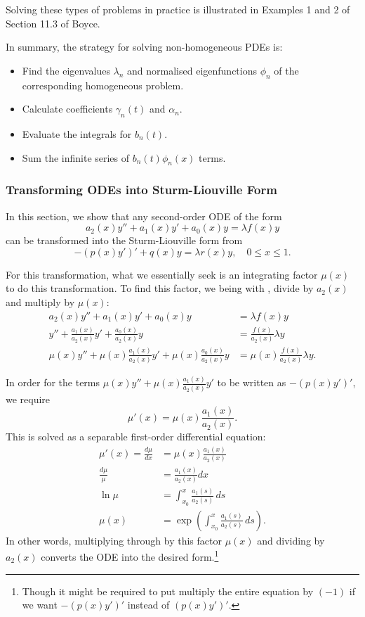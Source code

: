 Solving these types of problems in practice is illustrated in Examples 1 and 2 of Section 11.3 of Boyce.

In summary, the strategy for solving non-homogeneous PDEs is:
\begin{itemize}
	\item Find the eigenvalues $\lambda_n$ and normalised eigenfunctions $\phi_n$ of the corresponding homogeneous problem.
	\item Calculate coefficients $\gamma_n(t)$ and $\alpha_n$.
	\item Evaluate the integrals for $b_n(t)$.
	\item Sum the infinite series of $b_n(t) \phi_n(x)$ terms.
\end{itemize}


\subsubsection{Transforming ODEs into Sturm-Liouville Form}

In this section, we show that any second-order ODE of the form
\begin{equation}\label{eq:sltransform}
	a_2(x)y'' + a_1(x)y' + a_0(x)y = \lambda f(x)y
\end{equation}
can be transformed into the Sturm-Liouville form from 
\begin{equation}\label{eq:sltransform2}
	-\left(p(x)y'\right)' + q(x)y = \lambda r(x)y, \quad 0 \leq x \leq 1.
\end{equation}

For this transformation, what we essentially seek is an integrating factor $\mu(x)$ to do this transformation. To find this factor, we being with , divide by $a_2(x)$ and multiply by $\mu(x)$:
\begin{align*}
	a_2(x)y'' + a_1(x)y' + a_0(x)y &= \lambda f(x)y \\
	y'' + \frac{a_1(x)}{a_2(x)}y' + \frac{a_0(x)}{a_2(x)}y &= \frac{f(x)}{a_2(x)}\lambda y \\
	\mu(x)y'' + \mu(x)\frac{a_1(x)}{a_2(x)}y' + \mu(x)\frac{a_0(x)}{a_2(x)}y &= \mu(x)\frac{f(x)}{a_2(x)}\lambda y.
\end{align*}

In order for the terms $\mu(x)y'' + \mu(x)\frac{a_1(x)}{a_2(x)}y'$ to be written as $-(p(x)y')'$, we require
\[
\mu'(x) = \mu(x)\frac{a_1(x)}{a_2(x)}.
\]
This is solved as a separable first-order differential equation:
\begin{align*}
	\mu'(x) = \frac{d\mu}{dx} &= \mu(x)\frac{a_1(x)}{a_2(x)} \\
	\frac{d\mu}{\mu} &= \frac{a_1(x)}{a_2(x)} dx \\ 
	\ln\mu &= \int_{x_0}^x \frac{a_1(s)}{a_2(s)} \,ds \\
	\mu(x) &= \exp\left(\int_{x_0}^x \frac{a_1(s)}{a_2(s)} \,ds\right).
\end{align*}
In other words, multiplying through by this factor $\mu(x)$ and dividing by $a_2(x)$ converts the ODE into the desired form.\footnote{Though it might be required to put multiply the entire equation by $(-1)$ if we want $-(p(x)y')'$ instead of $(p(x)y')'$.}

